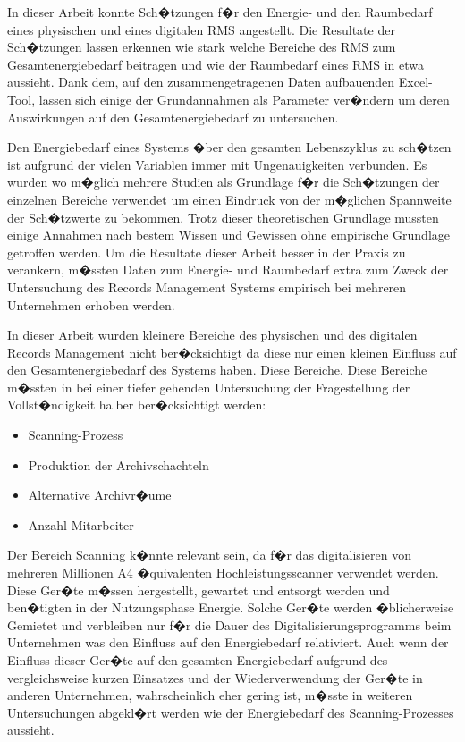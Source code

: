 \documentclass[a4paper,twoside,10pt]{report}
\begin{document}
In dieser Arbeit konnte Sch�tzungen f�r den Energie- und den Raumbedarf eines physischen und eines digitalen \ac{RMS} angestellt. Die Resultate der Sch�tzungen lassen erkennen wie stark welche Bereiche des \ac{RMS} zum Gesamtenergiebedarf beitragen und wie der Raumbedarf eines \ac{RMS} in etwa aussieht. Dank dem, auf den zusammengetragenen Daten aufbauenden Excel-Tool, lassen sich einige der Grundannahmen als Parameter ver�ndern um deren Auswirkungen auf den Gesamtenergiebedarf zu untersuchen.  

Den Energiebedarf eines Systems �ber den gesamten Lebenszyklus zu sch�tzen ist aufgrund der vielen Variablen immer mit Ungenauigkeiten verbunden. Es wurden wo m�glich mehrere Studien als Grundlage f�r die Sch�tzungen der einzelnen Bereiche verwendet um einen Eindruck von der m�glichen Spannweite der Sch�tzwerte zu bekommen. Trotz dieser theoretischen Grundlage mussten einige Annahmen nach bestem Wissen und Gewissen ohne empirische Grundlage getroffen werden. Um die Resultate dieser Arbeit besser in der Praxis zu verankern, m�ssten Daten zum Energie- und Raumbedarf extra zum Zweck der Untersuchung des Records Management Systems empirisch bei mehreren Unternehmen erhoben werden.

In dieser Arbeit wurden kleinere Bereiche des physischen und des digitalen Records Management nicht ber�cksichtigt da diese nur einen kleinen Einfluss auf den Gesamtenergiebedarf des Systems haben. Diese Bereiche. Diese Bereiche m�ssten in bei einer tiefer gehenden Untersuchung der Fragestellung der Vollst�ndigkeit halber ber�cksichtigt werden:

\begin{itemize}
	\item Scanning-Prozess
	\item Produktion der Archivschachteln
	\item Alternative Archivr�ume
	\item Anzahl Mitarbeiter 
\end{itemize}

Der Bereich Scanning k�nnte relevant sein, da f�r das digitalisieren von mehreren Millionen A4 �quivalenten Hochleistungsscanner verwendet werden. Diese Ger�te m�ssen hergestellt, gewartet und entsorgt werden und ben�tigten in der Nutzungsphase Energie. Solche Ger�te werden �blicherweise Gemietet und verbleiben nur f�r die Dauer des Digitalisierungsprogramms beim Unternehmen was den Einfluss auf den Energiebedarf relativiert. Auch wenn der Einfluss dieser Ger�te auf den gesamten Energiebedarf aufgrund des vergleichsweise kurzen Einsatzes und der Wiederverwendung der Ger�te in anderen Unternehmen, wahrscheinlich eher gering ist, m�sste in weiteren Untersuchungen abgekl�rt werden wie der Energiebedarf des Scanning-Prozesses aussieht. 
\end{document}
